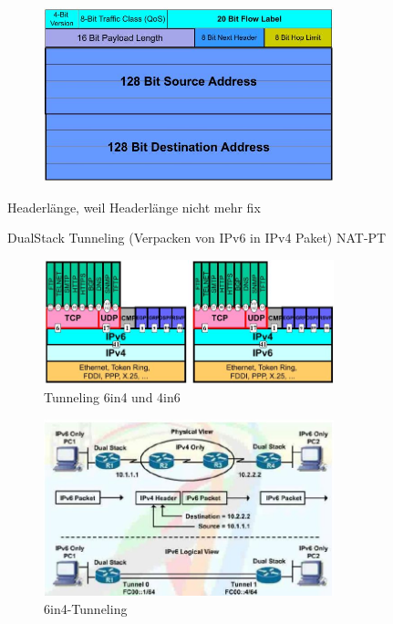 \documentclass[ngerman,a4paper,12pt]{scrreprt}
\begin{document}
\ulE

\begin{figure}[H]
	\centering
	\includegraphics[width=0.75\textwidth]{img/V10.4.jpg}
	\caption{}
	\label{}
\end{figure}
\ul
	\li Headerlänge, weil Headerlänge nicht mehr fix
\ulE


\ul
	\li DualStack
	\li Tunneling (Verpacken von IPv6 in IPv4 Paket)
	\li NAT-PT
\ulE

\begin{figure}[H]
	\centering
	\includegraphics[width=0.75\textwidth]{img/V10.5.jpg}
	\caption{Tunneling 6in4 und 4in6}
	\label{}
\end{figure}

\begin{figure}[H]
	\centering
	\includegraphics[width=0.75\textwidth]{img/V10.6.jpg}
	\caption{6in4-Tunneling}
	\label{}
\end{figure}
\end{document}
